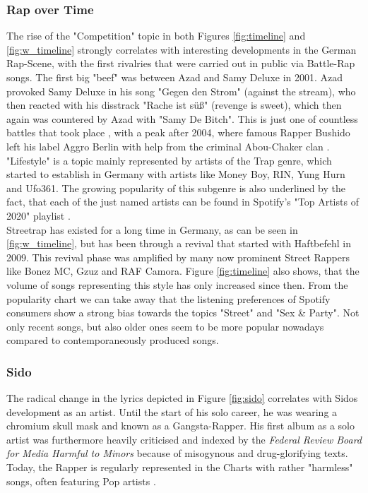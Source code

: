 \documentclass[conference]{IEEEtran}
\begin{document}
\subsubsection{Rap over Time} \label{discussion_timeline}
The rise of the "Competition" topic in both Figures \ref{fig:timeline} and \ref{fig:w_timeline} strongly correlates with interesting developments in the German Rap-Scene, with the first rivalries that were carried out in public via Battle-Rap songs. The first big "beef" was between Azad and Samy Deluxe in 2001. Azad provoked Samy Deluxe in his song "Gegen den Strom" (against the stream), who then reacted with his disstrack "Rache ist süß" (revenge is sweet), which then again was countered by Azad with "Samy De Bitch". This is just one of countless battles that took place \cite{battles}, with a peak after 2004, where famous Rapper Bushido left his label Aggro Berlin with help from the criminal Abou-Chaker clan \cite{abou-chaker}.\\
"Lifestyle" is a topic mainly represented by artists of the Trap genre, which started to establish in Germany with artists like Money Boy, RIN, Yung Hurn and Ufo361. The growing popularity of this subgenre is also underlined by the fact, that each of the just named artists can be found in Spotify's "Top Artists of 2020" playlist \cite{spotify_2020}.\\
Streetrap has existed for a long time in Germany, as can be seen in \ref{fig:w_timeline}, but has been through a revival that started with Haftbefehl in 2009. This revival phase was amplified by many now prominent Street Rappers like Bonez MC, Gzuz and RAF Camora\cite{strassenrap}. Figure \ref{fig:timeline} also shows, that the volume of songs representing this style has only increased since then. From the popularity chart we can take away that the listening preferences of Spotify consumers show a strong bias towards the topics "Street" and "Sex \& Party". Not only recent songs, but also older ones seem to be more popular nowadays compared to contemporaneously produced songs.
\subsubsection{Sido}
The radical change in the lyrics depicted in Figure \ref{fig:sido} correlates with Sidos development as an artist. Until the start of his solo career, he was wearing a chromium skull mask and known as a Gangsta-Rapper. His first album as a solo artist was furthermore heavily criticised and indexed \cite{urteil} by the \textit{Federal Review Board for Media Harmful to Minors} \cite{bpjm} because of misogynous and drug-glorifying texts. Today, the Rapper is regularly represented in the Charts with rather "harmless" songs, often featuring Pop artists \cite{sido_charts}.
\end{document}
